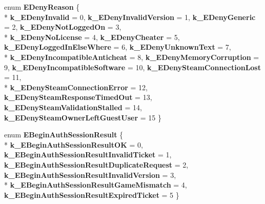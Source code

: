 \begin{DoxyCompactItemize}
\item 
\hypertarget{namespaceValve_1_1Steamworks_a5acc0114c8cecc09f73bd28d48ce9f9a}{}enum {\bfseries E\+Deny\+Reason} \{ \\*
{\bfseries k\+\_\+\+E\+Deny\+Invalid} = 0, 
{\bfseries k\+\_\+\+E\+Deny\+Invalid\+Version} = 1, 
{\bfseries k\+\_\+\+E\+Deny\+Generic} = 2, 
{\bfseries k\+\_\+\+E\+Deny\+Not\+Logged\+On} = 3, 
\\*
{\bfseries k\+\_\+\+E\+Deny\+No\+License} = 4, 
{\bfseries k\+\_\+\+E\+Deny\+Cheater} = 5, 
{\bfseries k\+\_\+\+E\+Deny\+Logged\+In\+Else\+Where} = 6, 
{\bfseries k\+\_\+\+E\+Deny\+Unknown\+Text} = 7, 
\\*
{\bfseries k\+\_\+\+E\+Deny\+Incompatible\+Anticheat} = 8, 
{\bfseries k\+\_\+\+E\+Deny\+Memory\+Corruption} = 9, 
{\bfseries k\+\_\+\+E\+Deny\+Incompatible\+Software} = 10, 
{\bfseries k\+\_\+\+E\+Deny\+Steam\+Connection\+Lost} = 11, 
\\*
{\bfseries k\+\_\+\+E\+Deny\+Steam\+Connection\+Error} = 12, 
{\bfseries k\+\_\+\+E\+Deny\+Steam\+Response\+Timed\+Out} = 13, 
{\bfseries k\+\_\+\+E\+Deny\+Steam\+Validation\+Stalled} = 14, 
{\bfseries k\+\_\+\+E\+Deny\+Steam\+Owner\+Left\+Guest\+User} = 15
 \}\label{namespaceValve_1_1Steamworks_a5acc0114c8cecc09f73bd28d48ce9f9a}

\item 
\hypertarget{namespaceValve_1_1Steamworks_a7e1788daf42c43ac09d8e71ea282109f}{}enum {\bfseries E\+Begin\+Auth\+Session\+Result} \{ \\*
{\bfseries k\+\_\+\+E\+Begin\+Auth\+Session\+Result\+O\+K} = 0, 
{\bfseries k\+\_\+\+E\+Begin\+Auth\+Session\+Result\+Invalid\+Ticket} = 1, 
{\bfseries k\+\_\+\+E\+Begin\+Auth\+Session\+Result\+Duplicate\+Request} = 2, 
{\bfseries k\+\_\+\+E\+Begin\+Auth\+Session\+Result\+Invalid\+Version} = 3, 
\\*
{\bfseries k\+\_\+\+E\+Begin\+Auth\+Session\+Result\+Game\+Mismatch} = 4, 
{\bfseries k\+\_\+\+E\+Begin\+Auth\+Session\+Result\+Expired\+Ticket} = 5
 \}\label{namespaceValve_1_1Steamworks_a7e1788daf42c43ac09d8e71ea282109f}


\end{DoxyCompactItemize}

